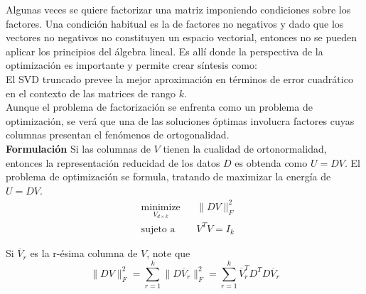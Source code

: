 \documentclass{article}
\begin{document}
Algunas veces se quiere factorizar una matriz imponiendo condiciones sobre los factores. Una condición habitual es
la de factores no negativos y dado que los vectores no negativos no constituyen un espacio vectorial, entonces no se
pueden aplicar los principios del álgebra lineal. Es allí donde la perspectiva de la optimización es importante y permite
crear síntesis como:\\
El SVD truncado prevee la mejor aproximación en términos de error cuadrático en el contexto de las matrices de rango $k$.\\
Aunque el problema de factorización se enfrenta como un problema de optimización, se verá que una de las soluciones óptimas
involucra factores cuyas columnas presentan el fenómenos de ortogonalidad.\\

\textbf{Formulación}
Si las columnas de $V$ tienen la cualidad de ortonormalidad, entonces la representación reducidad de los datos $D$ es
obtenda como $U=DV$. El problema de optimización se formula, tratando de maximizar la energía de $U=DV$.\\

\begin{equation*}
\begin{aligned}
& \underset{V _{d\times k} }{\text{minimize}}
& & \|DV\| _{F} ^{ 2}   \\
& \text{sujeto a}
& & V ^{T}V = I _{k }
\end{aligned}
\end{equation*}

Si $\overline{V} _{r} $ es la r-ésima columna de $V$, note que
$$\|DV\| _{F} ^{ 2} = \displaystyle \sum _{r=1} ^{ k}  \|D \overline{V} _{r}\| _{F} ^{ 2}
= \sum _{r=1} ^{ k} \overline{V} _{r}^{T} D ^{T}D \overline{V} _{r}   $$
\end{document}
